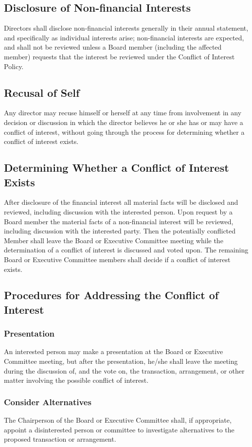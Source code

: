 \documentclass[letterpaper,12pt]{article}
\begin{document}
\subsection{Disclosure of Non-financial Interests}
\label{sec:org84c15cd}
Directors shall disclose non-financial interests generally in their
annual statement, and specifically as individual interests
arise; non-financial interests are expected, and shall not be
reviewed unless a Board member (including the affected member)
requests that the interest be reviewed under the Conflict of
Interest Policy.
\subsection{Recusal of Self}
\label{sec:orgfbaeaee}
Any director may recuse himself or herself at any time from
involvement in any decision or discussion in which the director
believes he or she has or may have a conflict of interest, without
going through the process for determining whether a conflict of
interest exists.
\subsection{Determining Whether a Conflict of Interest Exists}
\label{sec:org8d623ff}
After disclosure of the financial interest all material facts will
be disclosed and reviewed, including discussion with the interested
person. Upon request by a Board member the material facts of a
non-financial interest will be reviewed, including discussion with
the interested party. Then the potentially conflicted Member shall
leave the Board or Executive Committee meeting while the
determination of a conflict of interest is discussed and voted
upon. The remaining Board or Executive Committee members shall
decide if a conflict of interest exists.
\subsection{Procedures for Addressing the Conflict of Interest}
\label{sec:org9cf7463}
\subsubsection{Presentation}
\label{sec:org68691fc}
An interested person may make a presentation at the Board or
Executive Committee meeting, but after the presentation, he/she
shall leave the meeting during the discussion of, and the vote on,
the transaction, arrangement, or other matter involving the
possible conflict of interest.
\subsubsection{Consider Alternatives}
\label{sec:org810ed61}
The Chairperson of the Board or Executive Committee shall, if
appropriate, appoint a disinterested person or committee to
investigate alternatives to the proposed transaction or
arrangement.
\end{document}
